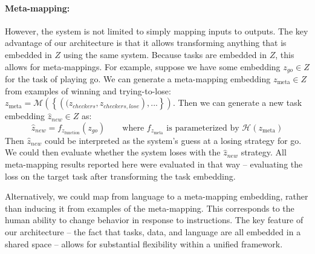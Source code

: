 \documentclass{article}
\begin{document}
\paragraph{Meta-mapping:} However, the system is not limited to simply mapping inputs to outputs. The key advantage of our architecture is that it allows transforming anything that is embedded in $Z$ using the same system. Because tasks are embedded in $Z$, this allows for meta-mappings. For example, suppose we have some embedding $z_{go} \in Z$ for the task of playing go. We can generate a meta-mapping embedding $z_{\text{meta}} \in Z$ from examples of winning and trying-to-lose: $z_{\text{meta}} = \mathcal{M}\left( \left\{\left((z_{checkers},z_{checkers,lose}\right), ... \right\}\right)$. Then we can generate a new task embedding $\hat{z}_{new} \in Z$ as:  
\[\hat{z}_{new} = f_{z_{\text{function}}}(z_{go}) \qquad \text{where } f_{z_{\text{meta}}} \text{ is parameterized by } \mathcal{H}\left(z_{\text{meta}}\right)\]
Then $\hat{z}_{new}$ could be interpreted as the system's guess at a losing strategy for go. We could then evaluate whether the system loses with the $\hat{z}_{new}$ strategy. All meta-mapping results reported here were evaluated in that way -- evaluating the loss on the target task after transforming the task embedding. \par
Alternatively, we could map from language to a meta-mapping embedding, rather than inducing it from examples of the meta-mapping. This corresponds to the human ability to change behavior in response to instructions. The key feature of our architecture -- the fact that tasks, data, and language are all embedded in a shared space -- allows for substantial flexibility within a unified framework. 

%
\end{document}
